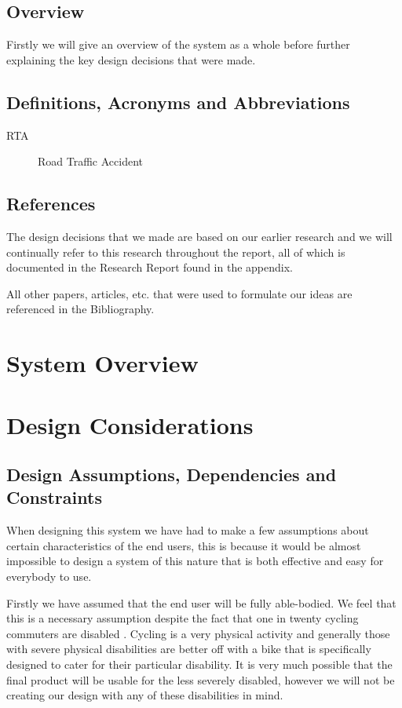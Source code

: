 \documentclass[]{report}
\begin{document}
\section{Overview}
Firstly we will give an overview of the system as a whole before further explaining the key design decisions that were made. 
\section{Definitions, Acronyms and Abbreviations}
\begin{description}
\item[RTA] Road Traffic Accident
\end{description}
\section{References}
The design decisions that we made are based on our earlier research and we will continually refer to this research throughout the report, all of which is documented in the Research Report found in the appendix. 

All other papers, articles, etc. that were used to formulate our ideas are referenced in the Bibliography.

\chapter{System Overview}

\chapter{Design Considerations}
\section{Design Assumptions, Dependencies and Constraints}
When designing this system we have had to make a few assumptions about certain characteristics of the end users, this is because it would be almost impossible to design a system of this nature that is both effective and easy for everybody to use. 

Firstly we have assumed that the end user will be fully able-bodied. We feel that this is a necessary assumption despite the fact that one in twenty cycling commuters are disabled \citep{wheelsforwell}. Cycling is a very physical activity and generally those with severe physical disabilities are better off with a bike that is specifically designed to cater for their particular disability. It is very much possible that the final product will be usable for the less severely disabled, however we will not be creating our design with any of these disabilities in mind.
\end{document}
